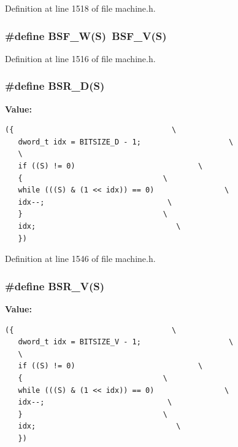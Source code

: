Definition at line 1518 of file machine.h.
\subsubsection[{BSF\_\-W}]{\setlength{\rightskip}{0pt plus 5cm}\#define BSF\_\-W(S)~BSF\_\-V(S)}\label{machine_8h_42014216615332e795c9ee0f63724ba0}




Definition at line 1516 of file machine.h.
\subsubsection[{BSR\_\-D}]{\setlength{\rightskip}{0pt plus 5cm}\#define BSR\_\-D(S)}\label{machine_8h_90a29fb4664000f56d006f5581abf862}


\textbf{Value:}

\begin{Code}\begin{verbatim}({                                    \
   dword_t idx = BITSIZE_D - 1;                    \
   \
   if ((S) != 0)                            \
   {                                \
   while (((S) & (1 << idx)) == 0)                \
   idx--;                            \
   }                                \
   idx;                                \
   })
\end{verbatim}
\end{Code}


Definition at line 1546 of file machine.h.
\subsubsection[{BSR\_\-V}]{\setlength{\rightskip}{0pt plus 5cm}\#define BSR\_\-V(S)}\label{machine_8h_ffdd5a0678a1d012b1cc485f143ca0f2}


\textbf{Value:}

\begin{Code}\begin{verbatim}({                                    \
   dword_t idx = BITSIZE_V - 1;                    \
   \
   if ((S) != 0)                            \
   {                                \
   while (((S) & (1 << idx)) == 0)                \
   idx--;                            \
   }                                \
   idx;                                \
   })
\end{verbatim}
\end{Code}


